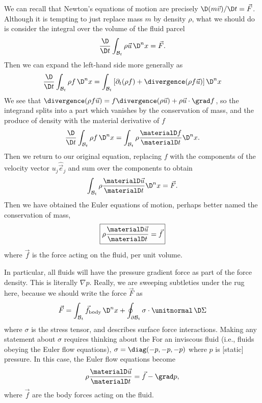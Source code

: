 \begin{node}\label{fluids:euler-flow-0001}%
We can recall that Newton's equations of motion are precisely
$\D(m\vec{v})/\D t = \vec{F}$. Although it is tempting to just replace
mass $m$ by density $\rho$, what we should do is consider the integral
over the volume of the fluid parcel
\begin{equation}
\frac{\D}{\D t}\int_{\mathcal{B}_{t}}\rho\vec{u}\,\D^{n}x = \vec{F}.
\end{equation}
Then we can expand the left-hand side more generally as
\begin{equation}
\frac{\D}{\D t}\int_{\mathcal{B}_{t}}\rho f\,\D^{n}x = 
\int_{\mathcal{B}_{t}}\left[\partial_{t}(\rho f)+\divergence(\rho f\vec{u})\right]\D^{n}x
\end{equation}
We see that $\divergence(\rho
f\vec{u})=f\divergence(\rho\vec{u})+\rho\vec{u}\cdot\grad f$, so the
integrand splits into a part which vanishes by the conservation of mass,
and the produce of density with the material derivative of $f$
\begin{equation}
\frac{\D}{\D t}\int_{\mathcal{B}_{t}}\rho f\,\D^{n}x = 
\int_{\mathcal{B}_{t}}\rho\frac{\materialD f}{\materialD t}\D^{n}x.
\end{equation}
Then we return to our original equation, replacing $f$ with the
components of the velocity vector $u_{j}\widehat{\vec{e}}_{j}$
and sum over the components to obtain
\begin{equation}
\int_{\mathcal{B}_{t}}\rho\frac{\materialD\vec{u}}{\materialD t}\D^{n}x = \vec{F}.
\end{equation}
Then we have obtained the Euler equations of motion, perhaps better
named the conservation of mass,
\begin{equation}
\boxed{\rho\frac{\materialD\vec{u}}{\materialD t}=\vec{f}}
\end{equation}
where $\vec{f}$ is the force acting on the fluid, per unit volume.

\begin{node}\label{fluids:euler-flow-0005}%
In particular, all fluids will have the pressure gradient force as part
of the force density. This is literally $\nabla p$. Really, we are
sweeping subtleties under the rug here, because we should write the
force $\vec{F}$ as
\begin{equation*}
\vec{F}=\int_{\mathcal{B}_{t}}\vec{f}_{\text{body}}\,\D^{n}x+\oint_{\partial\mathcal{B}_{t}}\sigma\cdot\unitnormal\,\D\Sigma
\end{equation*}
where $\sigma$ is the stress tensor, and describes surface force
interactions. Making any statement about $\sigma$ requires thinking
about the  For an inviscous fluid (i.e., fluids obeying the Euler
flow equations), $\sigma=\diag(-p,-p,-p)$ where $p$ is [static] pressure.
In this case, the Euler flow equations become
\begin{equation}
\rho\frac{\materialD\vec{u}}{\materialD t}=\vec{f}-\grad p,
\end{equation}
where $\vec{f}$ are the body forces acting on the fluid.
\end{node} %


\end{node}

